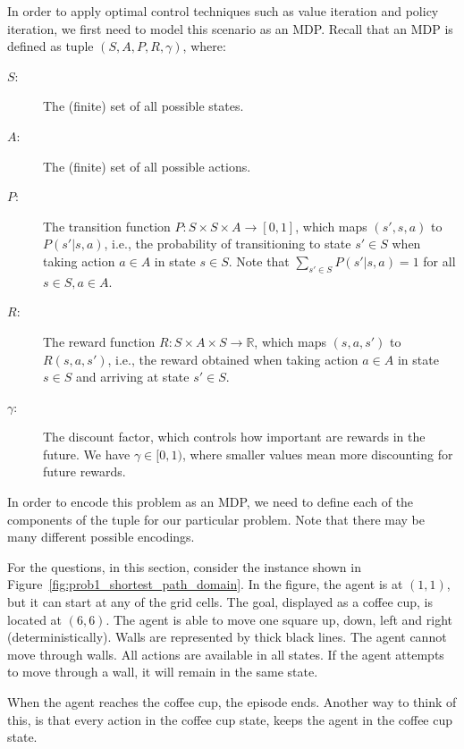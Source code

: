 \documentclass[12pt]{article}
\begin{document}
In order to apply optimal control techniques such as value
iteration and policy iteration, we first need to model this
scenario as an MDP. Recall that an MDP is defined as tuple
$(S, A, P, R, \gamma)$, where:
\begin{description}
\item[$S$:] The (finite) set of all possible states.
\item[$A$:] The (finite) set of all possible actions.
\item[$P$:] The transition function $P: S \times S \times A \to [0, 1]$, 
  which maps $(s', s, a)$ to $P(s'|s, a)$, i.e., 
  the probability of transitioning to state $s'\in S$ when taking action
  $a\in A$ in state $s\in S$. 
  Note that $\sum _{s' \in S} P(s' | s, a) = 1$ for all 
  $s \in S, a \in A$.
\item[$R$:] The reward function $R : S \times A \times S \to \mathbb R$,
which maps $(s, a, s')$ to $R(s, a, s')$, i.e., 
the reward obtained when taking action $a \in A$ in state $s \in S$ and 
arriving at state $s' \in S$.
\item[$\gamma$:] The discount factor, which controls how important are 
  rewards in the future. We have $\gamma \in [0, 1)$, where smaller values 
  mean more discounting for future rewards.
\end{description}

In order to encode this problem as an MDP, we need to define each of
the components of the tuple for our particular problem. 
Note that there may be many different possible encodings.

For the questions, in this section, consider the instance shown in
Figure~\ref{fig:prob1_shortest_path_domain}. In the figure, the agent
is at $(1,1)$, but it can start at any of
the grid cells. The goal, displayed as a coffee cup, is
located at $(6,6)$. The agent is able to move one square up, down,
left and right (deterministically). Walls are represented by thick black
lines. The agent cannot move through walls. All actions are available in
all states. If the agent attempts to move through a wall, 
it will remain in the same state.

When the agent reaches the coffee cup, the episode ends. Another way to
think of this, is that every action in the coffee cup state, keeps the
agent in the coffee cup state.
\end{document}
